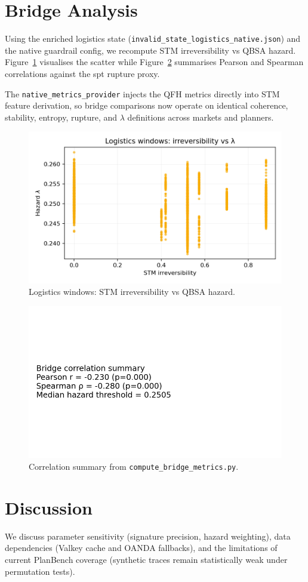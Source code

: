 \documentclass[11pt]{article}
\begin{document}
\section{Bridge Analysis}
Using the enriched logistics state (\texttt{invalid\_state\_logistics\_native.json}) and the native guardrail config, we recompute STM irreversibility vs QBSA hazard. Figure~\ref{fig:logistics-irr-lambda} visualises the scatter while Figure~\ref{fig:bridge-summary} summarises Pearson and Spearman correlations against the spt rupture proxy.

The \texttt{native\_metrics\_provider} injects the QFH metrics directly into STM feature derivation, so bridge comparisons now operate on identical coherence, stability, entropy, rupture, and $\lambda$ definitions across markets and planners.

\begin{figure}[t]
  \centering
  \includegraphics[width=0.75\linewidth]{../figures/fig3_logistics_irreversibility_vs_lambda.png}
  \caption{Logistics windows: STM irreversibility vs QBSA hazard.}
  \label{fig:logistics-irr-lambda}
\end{figure}

\begin{figure}[t]
  \centering
  \includegraphics[width=0.5\linewidth]{../figures/fig4_bridge_correlation_summary.png}
  \caption{Correlation summary from \texttt{compute\_bridge\_metrics.py}.}
  \label{fig:bridge-summary}
\end{figure}

\section{Discussion}
We discuss parameter sensitivity (signature precision, hazard weighting), data dependencies (Valkey cache and OANDA fallbacks), and the limitations of current PlanBench coverage (synthetic traces remain statistically weak under permutation tests).
\end{document}
